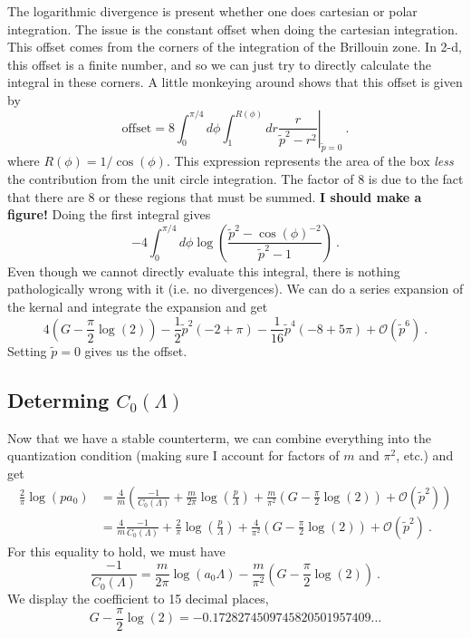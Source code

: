 The logarithmic divergence is present whether one does cartesian or polar integration.  The issue is the constant offset when doing the cartesian integration.  This offset comes from the corners of the integration of the Brillouin zone.  In 2-d, this offset is a finite number, and so we can just try to directly calculate the integral in these corners.  A little monkeying around shows that this offset is given by
\begin{equation}
\text{offset} = \left.8\int_0^{\pi/4}d\phi\int_1^{R(\phi)}dr\frac{r}{\tilde p^2-r^2}\right|_{\tilde p=0}\ .
\end{equation}
where $R(\phi)=1/\cos(\phi)$.  This expression represents the area of the box \emph{less} the contribution from the unit circle integration.  The factor of 8 is due to the fact that there are 8 or these regions that must be summed.  {\bf I should make a figure!}  Doing the first integral gives
\begin{equation}
-4\int_0^{\pi/4}d\phi \log\left(\frac{\tilde p^2-\cos(\phi)^{-2}}{\tilde p^2-1}\right)\ .
\end{equation}
Even though we cannot directly evaluate this integral, there is nothing pathologically wrong with it (i.e. no divergences).  We can do a series expansion of the kernal and integrate the expansion and get
\begin{equation}
4 \left(G-\frac{\pi}{2}\log(2)\right) - \frac{1}{2} \tilde p^2 (-2 + \pi) - 
 \frac{1}{16}\tilde p^4 (-8 + 5 \pi) +\mathcal{O}(\tilde p^6)\ .
\end{equation}
Setting $\tilde p=0$ gives us the offset.

\subsection{Determing $C_0(\Lambda)$}
Now that we have a stable counterterm, we can combine everything into the quantization condition (making sure I account for factors of $m$ and $\pi^2$, etc.) and get
\begin{align}
\frac{2}{\pi}\log(p a_0)&=\frac{4}{m} \left(\frac{-1}{C_{0}(\Lambda)}+\frac{m}{2 \pi} \log\left(\frac{p}{\Lambda}\right)+\frac{m}{\pi^2}\left(G-\frac{\pi}{2}\log(2)\right)+\mathcal{O}(\tilde p^2)\right)\nonumber\\
&=\frac{4}{m} \frac{-1}{C_{0}(\Lambda)}+\frac{2}{\pi}\log\left(\frac{p}{\Lambda}\right)+\frac{4}{\pi^2}\left(G-\frac{\pi}{2}\log(2)\right)+\mathcal{O}(\tilde p^2)\ .
\end{align}
For this equality to hold, we must have
\begin{equation}\label{eqn:ta da}
\boxed{
 \frac{-1}{C_{0}(\Lambda)}=\frac{m}{2\pi}\log\left(a_0\Lambda\right)-\frac{m}{\pi^2}\left(G-\frac{\pi}{2}\log(2)\right)
 }\ .
 \end{equation}
We display the coefficient to 15 decimal places,
\begin{displaymath}
G-\frac{\pi}{2}\log(2)=-0.1728274509745820501957409\ldots
\end{displaymath}

